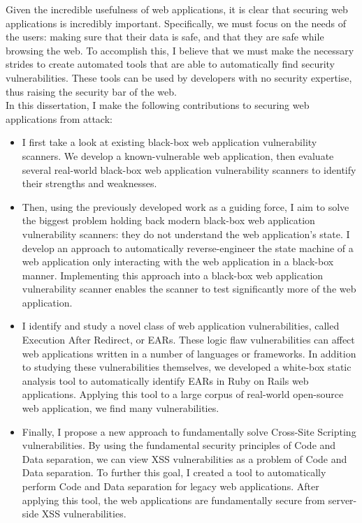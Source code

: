 \noindent{}Given the incredible usefulness of web applications, it is
clear that securing web applications is incredibly important.
Specifically, we must focus on the needs of the users: making sure
that their data is safe, and that they are safe while browsing the
web. To accomplish this, I believe that we must make the necessary
strides to create automated tools that are able to automatically find
security vulnerabilities. These tools can be used by developers with
no security expertise, thus raising the security bar of the web. 
\\

\noindent{}In this dissertation, I make the following contributions to securing
web applications from attack:

\begin{itemize}

\item I first take a look at existing black-box web application
  vulnerability scanners. We develop a known-vulnerable web
  application, then evaluate several real-world black-box web
  application vulnerability scanners to identify their strengths and
  weaknesses. 

\item Then, using the previously developed work as a guiding force, I
  aim to solve the biggest problem holding back modern black-box web
  application vulnerability scanners: they do not understand the web
  application's state. I develop an approach to automatically
  reverse-engineer the state machine of a web application only
  interacting with the web application in a black-box manner.
  Implementing this approach into a black-box web application
  vulnerability scanner enables the scanner to test significantly more
  of the web application. 

\item I identify and study a novel class of web application
  vulnerabilities, called Execution After Redirect, or EARs. These
  logic flaw vulnerabilities can affect web applications written in a
  number of languages or frameworks. In addition to studying these
  vulnerabilities themselves, we developed a white-box static analysis
  tool to automatically identify EARs in Ruby on Rails web
  applications. Applying this tool to a large corpus of real-world
  open-source web application, we find many vulnerabilities. 

\item Finally, I propose a new approach to fundamentally solve
  Cross-Site Scripting vulnerabilities. By using the fundamental
  security principles of Code and Data separation, we can view XSS
  vulnerabilities as a problem of Code and Data separation. To further
  this goal, I created a tool to automatically perform Code and Data
  separation for legacy web applications. After applying this tool,
  the web applications are fundamentally secure from server-side XSS
  vulnerabilities. 

\end{itemize}





